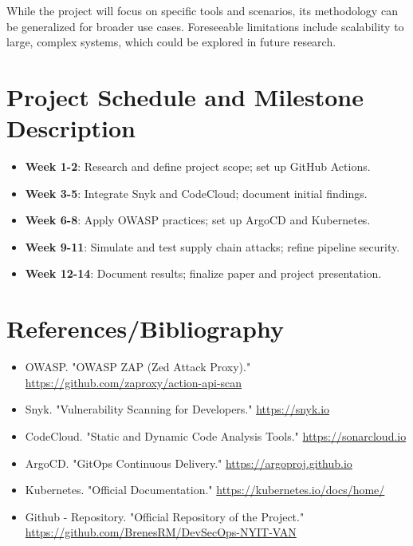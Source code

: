 \documentclass[a4paper,12pt]{article}
\begin{document}
While the project will focus on specific tools and scenarios, its methodology can be generalized for broader use cases. Foreseeable limitations include scalability to large, complex systems, which could be explored in future research.

\section{Project Schedule and Milestone Description}
\begin{itemize}
    \item \textbf{Week 1-2}: Research and define project scope; set up GitHub Actions.
    \item \textbf{Week 3-5}: Integrate Snyk and CodeCloud; document initial findings.
    \item \textbf{Week 6-8}: Apply OWASP practices; set up ArgoCD and Kubernetes.
    \item \textbf{Week 9-11}: Simulate and test supply chain attacks; refine pipeline security.
    \item \textbf{Week 12-14}: Document results; finalize paper and project presentation.
\end{itemize}

\section{References/Bibliography}
\begin{itemize}
    \item OWASP. "OWASP ZAP (Zed Attack Proxy)." \url{https://github.com/zaproxy/action-api-scan}
    \item Snyk. "Vulnerability Scanning for Developers." \url{https://snyk.io}
    \item CodeCloud. "Static and Dynamic Code Analysis Tools." \url{https://sonarcloud.io}
    \item ArgoCD. "GitOps Continuous Delivery." \url{https://argoproj.github.io}
    \item Kubernetes. "Official Documentation." \url{https://kubernetes.io/docs/home/}
    \item Github - Repository. "Official Repository of the Project." \url{https://github.com/BrenesRM/DevSecOps-NYIT-VAN}
\end{itemize}
\end{document}
